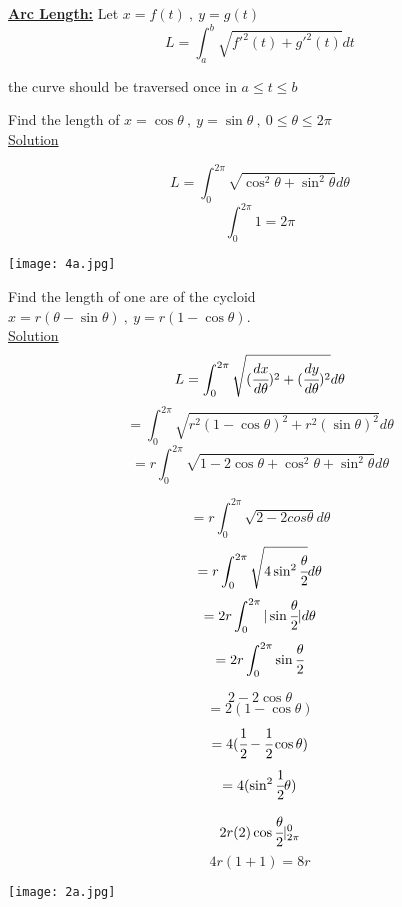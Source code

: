 \textbf{\color{smalt(darkpowderblue)}\large \underline{Arc Length:}}
Let $x=f(t)~,~y=g(t)$
$$L=\int_a^b\sqrt{f'^2(t)+g'^2(t)}dt$$
\begin{remark}
the curve should be traversed once in $a\leq t\leq b$
\end{remark}
\noindent{\color{smalt(darkpowderblue)}\rule{\linewidth}{.2mm}}
\begin{example}
Find the length of $x=\cos\theta~,~y=\sin\theta~,~0\leq\theta\leq 2\pi$\\
\underline{\color{smalt(darkpowderblue)}Solution} \\
\begin{minipage}{0.6\textwidth}
$$L=\int_0^{2\pi}\sqrt{\cos^2\theta+\sin^2\theta}d\theta$$
$$\int_0^{2\pi}1=2\pi$$
\end{minipage}
\begin{minipage}{0.6\textwidth}
\texttt{[image: 4a.jpg]}
\end{minipage}
\end{example}
\noindent{\color{smalt(darkpowderblue)}\rule{\linewidth}{.2mm}}
\begin{example}
Find the length of one are of the cycloid\\ $x=r(\theta-\sin\theta)~,~y=r(1-\cos\theta)$.\\
\underline{\color{smalt(darkpowderblue)}Solution} \\
$$L=\int_0^{2\pi}\sqrt{(\cfrac{dx}{d\theta})^2+(\cfrac{dy}{d\theta})^2}d\theta$$
$$=\int_0^{2\pi}\sqrt{r^2(1-\cos\theta)^2+r^2(\sin\theta)^2}d\theta$$
$$=r\int_0^{2\pi}\sqrt{1-2\cos\theta+\cos^2\theta+\sin^2\theta}d\theta$$
\begin{minipage}{0.5\textwidth}
$$=r\int_0^{2\pi}\sqrt{2-2cos\theta}d\theta$$
$$=r\int_0^{2\pi}\sqrt{4\sin^2\cfrac{\theta}{2}}d\theta$$
$$=2r\int_0^{2\pi}|\sin\cfrac{\theta}{2}|d\theta$$
$$=2r\int_0^{2\pi}\sin\cfrac{\theta}{2}$$
\end{minipage}
\begin{minipage}{0.5\textwidth}
$$2-2\cos\theta$$
$$=2(1-\cos\theta)$$
$$=4(\cfrac{1}{2}-\cfrac{1}{2}\cos\theta)$$
$$=4(\sin^2\cfrac{1}{2}\theta)$$
\end{minipage}
\begin{minipage}{0.6\textwidth}
$$2r(2)\cos\cfrac{\theta}{2}|_{2\pi}^0$$
$$4r(1+1)=8r$$
\end{minipage}
\begin{minipage}{0.5\textwidth}
\texttt{[image: 2a.jpg]}
\end{minipage}
\end{example}
